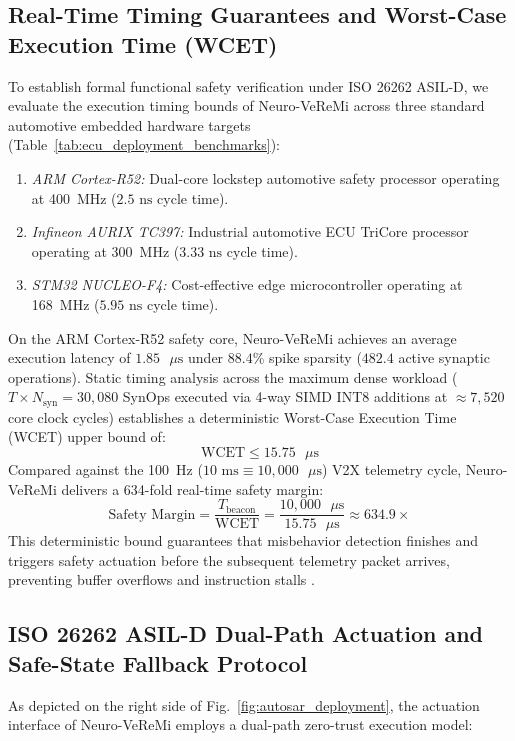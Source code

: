\documentclass[journal]{IEEEtran}
\begin{document}
\subsection{Real-Time Timing Guarantees and Worst-Case Execution Time (WCET)}
To establish formal functional safety verification under ISO 26262 ASIL-D, we evaluate the execution timing bounds of Neuro-VeReMi across three standard automotive embedded hardware targets (Table~\ref{tab:ecu_deployment_benchmarks}):
\begin{enumerate}
    \item \textit{ARM Cortex-R52:} Dual-core lockstep automotive safety processor operating at 400~MHz ($2.5\text{ ns}$ cycle time).
    \item \textit{Infineon AURIX TC397:} Industrial automotive ECU TriCore processor operating at 300~MHz ($3.33\text{ ns}$ cycle time).
    \item \textit{STM32 NUCLEO-F4:} Cost-effective edge microcontroller operating at 168~MHz ($5.95\text{ ns}$ cycle time).
\end{enumerate}
On the ARM Cortex-R52 safety core, Neuro-VeReMi achieves an average execution latency of $1.85\text{ }\mu\text{s}$ under $88.4\%$ spike sparsity ($482.4$ active synaptic operations). Static timing analysis across the maximum dense workload ($T \times N_{\text{syn}} = 30{,}080$ SynOps executed via 4-way SIMD INT8 additions at $\approx 7{,}520$ core clock cycles) establishes a deterministic Worst-Case Execution Time (WCET) upper bound of:
\begin{equation}
    \text{WCET} \le 15.75\text{ }\mu\text{s}
\end{equation}
Compared against the 100~Hz ($10\text{ ms} \equiv 10{,}000\text{ }\mu\text{s}$) V2X telemetry cycle, Neuro-VeReMi delivers a 634-fold real-time safety margin:
\begin{equation}
    \text{Safety Margin} = \frac{T_{\text{beacon}}}{\text{WCET}} = \frac{10{,}000\text{ }\mu\text{s}}{15.75\text{ }\mu\text{s}} \approx 634.9\times
\end{equation}
This deterministic bound guarantees that misbehavior detection finishes and triggers safety actuation before the subsequent telemetry packet arrives, preventing buffer overflows and instruction stalls \cite{wilhelm2008worst}.

\subsection{ISO 26262 ASIL-D Dual-Path Actuation and Safe-State Fallback Protocol}
As depicted on the right side of Fig.~\ref{fig:autosar_deployment}, the actuation interface of Neuro-VeReMi employs a dual-path zero-trust execution model:
\end{document}
